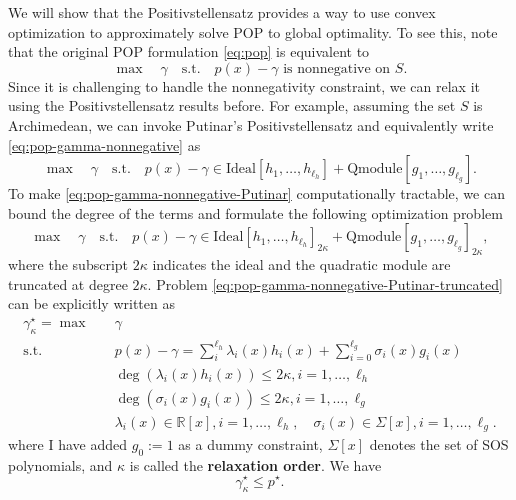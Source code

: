 \documentclass[
]{book}
\theoremstyle{definition}
\theoremstyle{definition}
\theoremstyle{definition}
\theoremstyle{definition}
\theoremstyle{remark}
\begin{document}
We will show that the Positivstellensatz provides a way to use convex optimization to approximately solve POP to global optimality. To see this, note that the original POP formulation \eqref{eq:pop} is equivalent to
\begin{equation}
\max \quad \gamma \quad \mathrm{s.t.}\quad p(x) - \gamma \text{ is nonnegative on } S. 
\label{eq:pop-gamma-nonnegative}
\end{equation}
Since it is challenging to handle the nonnegativity constraint, we can relax it using the Positivstellensatz results before. For example, assuming the set \(S\) is Archimedean, we can invoke Putinar's Positivstellensatz and equivalently write \eqref{eq:pop-gamma-nonnegative} as
\begin{equation}
\max \quad \gamma \quad \mathrm{s.t.}\quad p(x) - \gamma \in \mathrm{Ideal}[h_1,\dots,h_{\ell_h}] + \mathrm{Qmodule}[g_1,\dots,g_{\ell_g}]. 
\label{eq:pop-gamma-nonnegative-Putinar}
\end{equation}
To make \eqref{eq:pop-gamma-nonnegative-Putinar} computationally tractable, we can bound the degree of the terms and formulate the following optimization problem
\begin{equation}
\max \quad \gamma \quad \mathrm{s.t.}\quad p(x) - \gamma \in \mathrm{Ideal}[h_1,\dots,h_{\ell_h}]_{2\kappa} + \mathrm{Qmodule}[g_1,\dots,g_{\ell_g}]_{2\kappa},
\label{eq:pop-gamma-nonnegative-Putinar-truncated}
\end{equation}
where the subscript \(2\kappa\) indicates the ideal and the quadratic module are truncated at degree \(2\kappa\). Problem \eqref{eq:pop-gamma-nonnegative-Putinar-truncated} can be explicitly written as
\begin{equation}
\begin{split}
\gamma^\star_{\kappa}=\max & \quad \gamma\\
\mathrm{s.t.}& \quad p(x) - \gamma = \sum_{i}^{\ell_h} \lambda_i(x) h_i(x) + \sum_{i=0}^{\ell_g} \sigma_i(x) g_i(x) \\
& \quad \deg(\lambda_i(x) h_i(x)) \leq 2\kappa, i=1,\dots,\ell_h \\
& \quad \deg(\sigma_i(x) g_i(x)) \leq 2\kappa, i=1,\dots,\ell_g \\
& \quad \lambda_i(x) \in \mathbb{R}[x], i=1,\dots,\ell_h, \quad \sigma_i(x) \in \Sigma[x], i=1,\dots,\ell_g.
\end{split}
\label{eq:pop-gamma-nonnegative-Putinar-bound}
\end{equation}
where I have added \(g_0:=1\) as a dummy constraint, \(\Sigma[x]\) denotes the set of SOS polynomials, and \(\kappa\) is called the \textbf{relaxation order}. We have
\[
\gamma^\star_{\kappa} \leq p^\star.
\]
\end{document}
